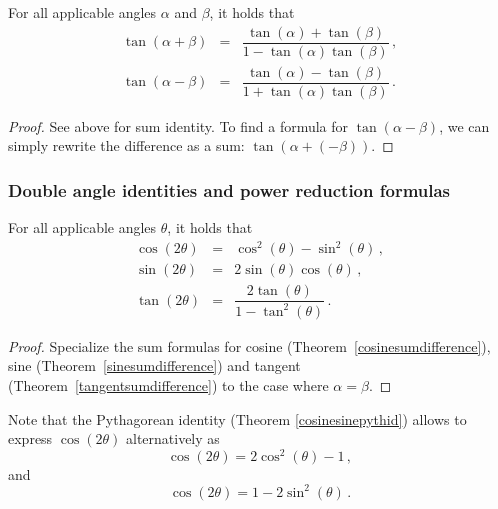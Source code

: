 \begin{theorem} \label{tangentsumdifference} For all applicable angles $\alpha$ and $\beta$, it holds that  
\begin{eqnarray}
\tan(\alpha + \beta) &=& \dfrac{\tan(\alpha) + \tan(\beta)}{1 -\tan(\alpha) \tan(\beta)}\,,\\[0.2cm]
\tan(\alpha - \beta) &=&\dfrac{\tan(\alpha) - \tan(\beta)}{1 +\tan(\alpha) \tan(\beta)}\,.
\end{eqnarray}


\end{theorem}
\ifanalysis\begin{proof}
See above for sum identity. To find a formula for $\tan(\alpha - \beta)$, we can simply rewrite the difference as a sum: $\tan(\alpha + (-\beta))$.
\end{proof}
\fi




\subsubsection{Double angle identities and power reduction formulas}



\begin{theorem} \label{doubleangle}   For all applicable angles $\theta$, it holds that
\begin{eqnarray}
\cos(2\theta) &=& \cos^{2}(\theta) - \sin^{2}(\theta)\,,\\[0.2cm]
\sin(2\theta) &=& 2\sin(\theta)\cos(\theta)\,,\\[0.2cm]
\tan(2\theta) &=& \dfrac{2\tan(\theta)}{1 - \tan^{2}(\theta)}\,.
\end{eqnarray}
\vspace{-0.4cm}
\end{theorem}
\begin{proof}
Specialize the sum formulas for cosine (Theorem~\ref{cosinesumdifference}), sine (Theorem~\ref{sinesumdifference}) and tangent (Theorem~\ref{tangentsumdifference}) to the case where $\alpha = \beta$.
\end{proof}
Note that the Pythagorean identity (Theorem \ref{cosinesinepythid}) allows to express $\cos(2\theta)$ alternatively as
\begin{equation}
\cos(2\theta)= 2\cos^{2}(\theta) - 1\,,
\label{doubleanglecos}
\end{equation}
and 
\begin{equation}
\cos(2\theta) = 1-2\sin^{2}(\theta)\,.
\label{doubleanglesin}
\end{equation}

